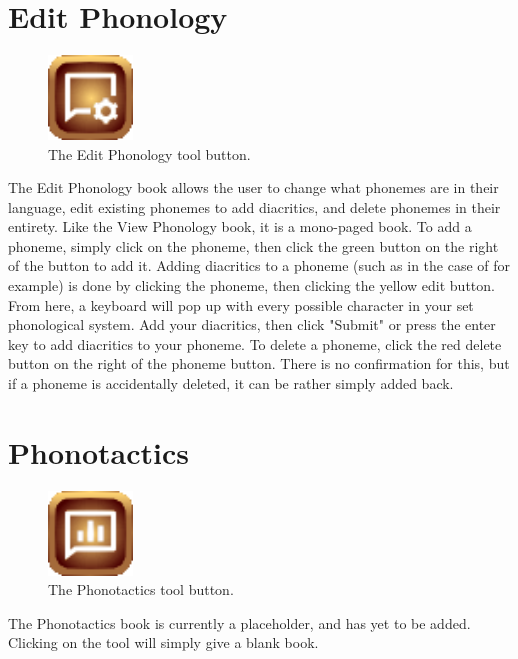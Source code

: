 \documentclass{report}
\begin{document}
	\section{Edit Phonology}
	\begin{figure}
		\centering
		\includegraphics[width=0.2\textwidth]{img/edit-phonology}
		\caption{The Edit Phonology tool button.}
		\label{fig:edit-phonology}
	\end{figure}
	The Edit Phonology book allows the user to change what phonemes are in their language, edit existing phonemes to add diacritics, and delete phonemes in their entirety. Like the View Phonology book, it is a mono-paged book. To add a phoneme, simply click on the phoneme, then click the green button on the right of the button to add it. Adding diacritics to a phoneme (such as in the case of  for example) is done by clicking the phoneme, then clicking the yellow edit button. From here, a keyboard will pop up with every possible character in your set phonological system. Add your diacritics, then click "Submit" or press the enter key to add diacritics to your phoneme. To delete a phoneme, click the red delete button on the right of the phoneme button. There is no confirmation for this, but if a phoneme is accidentally deleted, it can be rather simply added back.
	\section{Phonotactics}
	\begin{figure}
		\centering
		\includegraphics[width=0.2\textwidth]{img/phonotactics}
		\caption{The Phonotactics tool button.}
		\label{fig:phonotactics}
	\end{figure}
	The Phonotactics book is currently a placeholder, and has yet to be added. Clicking on the tool will simply give a blank book.
	
\end{document}
